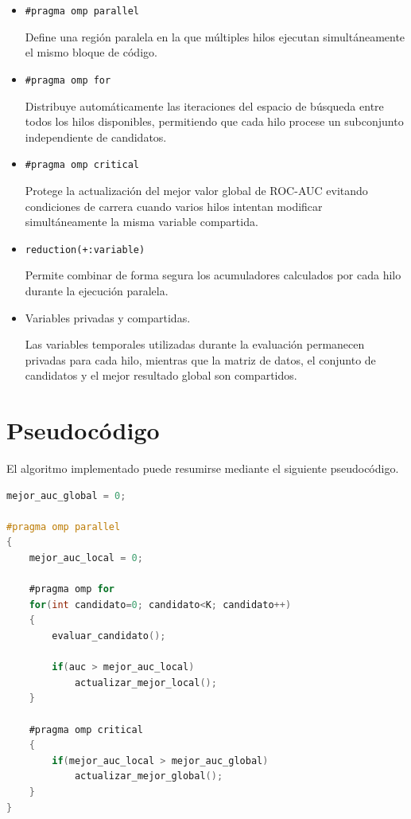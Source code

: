 \begin{itemize}

\item \texttt{\#pragma omp parallel}

Define una región paralela en la que múltiples hilos ejecutan simultáneamente el mismo bloque de código.

\item \texttt{\#pragma omp for}

Distribuye automáticamente las iteraciones del espacio de búsqueda entre todos los hilos disponibles, permitiendo que cada hilo procese un subconjunto independiente de candidatos.

\item \texttt{\#pragma omp critical}

Protege la actualización del mejor valor global de ROC-AUC evitando condiciones de carrera cuando varios hilos intentan modificar simultáneamente la misma variable compartida.

\item \texttt{reduction(+:variable)}

Permite combinar de forma segura los acumuladores calculados por cada hilo durante la ejecución paralela.

\item Variables privadas y compartidas.

Las variables temporales utilizadas durante la evaluación permanecen privadas para cada hilo, mientras que la matriz de datos, el conjunto de candidatos y el mejor resultado global son compartidos.

\end{itemize}


\section{Pseudocódigo}

El algoritmo implementado puede resumirse mediante el siguiente pseudocódigo.

\begin{lstlisting}[language=C]
mejor_auc_global = 0;

#pragma omp parallel
{
    mejor_auc_local = 0;

    #pragma omp for
    for(int candidato=0; candidato<K; candidato++)
    {
        evaluar_candidato();

        if(auc > mejor_auc_local)
            actualizar_mejor_local();
    }

    #pragma omp critical
    {
        if(mejor_auc_local > mejor_auc_global)
            actualizar_mejor_global();
    }
}
\end{lstlisting}

